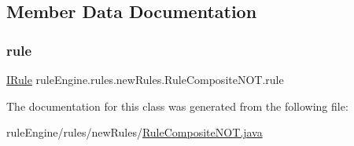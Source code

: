 \subsection{Member Data Documentation}
\mbox{\label{classrule_engine_1_1rules_1_1new_rules_1_1_rule_composite_n_o_t_aa13491e8dba5f09e1451dc388ae9f9be}} 
\subsubsection{\texorpdfstring{rule}{rule}}
{\footnotesize\ttfamily \mbox{\hyperlink{interfacerule_engine_1_1rules_1_1new_rules_1_1_i_rule}{I\+Rule}} rule\+Engine.\+rules.\+new\+Rules.\+Rule\+Composite\+N\+O\+T.\+rule\hspace{0.3cm}{\ttfamily [private]}}



The documentation for this class was generated from the following file\+:\begin{DoxyCompactItemize}
\item 
rule\+Engine/rules/new\+Rules/\mbox{\hyperlink{_rule_composite_n_o_t_8java}{Rule\+Composite\+N\+O\+T.\+java}}\end{DoxyCompactItemize}

